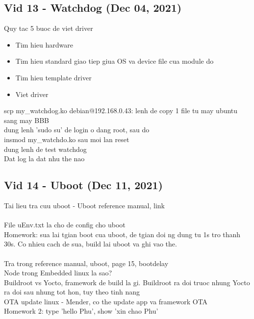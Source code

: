 \subsection{Vid 13 - Watchdog (Dec 04, 2021)}
Quy tac 5 buoc de viet driver
\begin{itemize}
  \item Tim hieu hardware 
  \item Tim hieu standard giao tiep giua OS va device file cua module do
  \item Tim hieu template driver
  \item Viet driver
\end{itemize}
scp my\_watchdog.ko debian@192.168.0.43: lenh de copy 1 file tu may ubuntu sang may BBB
\\dung lenh 'sudo su' de login o dang root, sau do
\\insmod my\_watchdo.ko sau moi lan reset
\\dung lenh  de test watchdog
\\Dat log la dat nhu the nao

\subsection{Vid 14 - Uboot (Dec 11, 2021)}
Tai lieu tra cuu uboot - Uboot reference manual,
link \\
\\File uEnv.txt la cho de config cho uboot
\\Homework: sua lai tgian boot cua uboot, de tgian doi ng dung tu 1s tro thanh 30s. 
Co nhieu cach de sua, build lai uboot va ghi vao the.\\
\\Tra trong reference manual, uboot, page 15, bootdelay
\\Node trong Embedded linux la sao?
\\Buildroot vs Yocto, framework de build la gi. 
Buildroot ra doi truoc nhung Yocto ra doi sau nhung tot hon, tuy theo tinh nang
\\OTA update linux - Mender, co the update app va framework OTA
\\Homework 2: type 'hello Phu', show 'xin chao Phu'